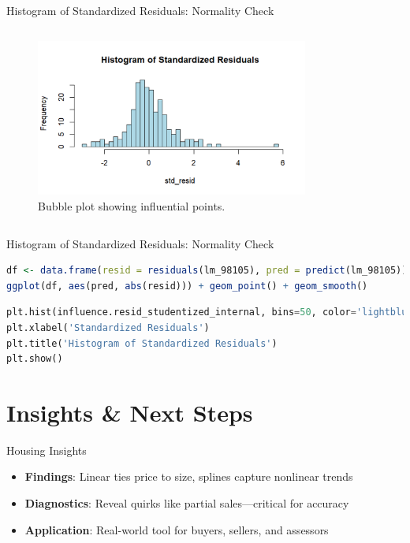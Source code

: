 \documentclass{beamer}
\begin{document}
	\begin{frame}{Histogram of Standardized Residuals: Normality Check}
		\begin{columns}
			
			\begin{figure}
				\includegraphics[width=0.8\textwidth]{histo.png}
				\caption{Bubble plot showing influential points.}
			\end{figure}
		\end{columns}
	\end{frame}

\begin{frame}[fragile]{Histogram of Standardized Residuals: Normality Check}
	\begin{itemize}
	\end{itemize}
	
	\begin{lstlisting}[language=R, caption=Histogram of Standardized Residuals in R]
df <- data.frame(resid = residuals(lm_98105), pred = predict(lm_98105))
ggplot(df, aes(pred, abs(resid))) + geom_point() + geom_smooth()
	\end{lstlisting}
	\begin{lstlisting}[language=Python, caption=Histogram of Standardized Residuals in Python]
plt.hist(influence.resid_studentized_internal, bins=50, color='lightblue')
plt.xlabel('Standardized Residuals')
plt.title('Histogram of Standardized Residuals')
plt.show()
	\end{lstlisting}
\end{frame}
	
	\section{Insights \& Next Steps}
	
	\begin{frame}{Housing Insights}
		\begin{itemize}
			\item \textbf{Findings}: Linear ties price to size, splines capture nonlinear trends
			\item \textbf{Diagnostics}: Reveal quirks like partial sales—critical for accuracy
			\item \textbf{Application}: Real-world tool for buyers, sellers, and assessors
		\end{itemize}
	\end{frame}
	
\end{document}
